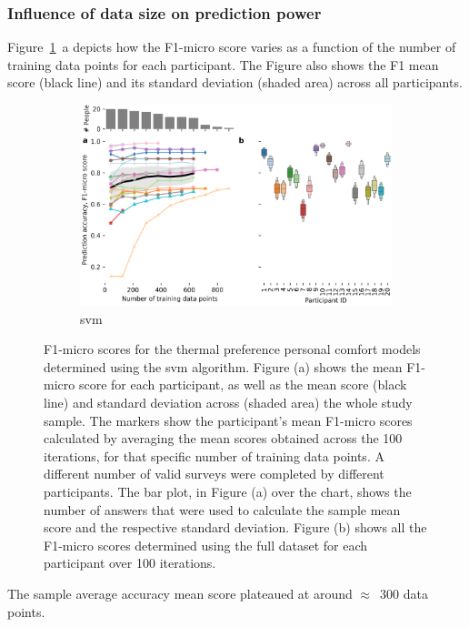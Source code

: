 \subsubsection{Influence of data size on prediction power}
Figure~\ref{fig:thermal_f1_micro_env_sma_oth}~a depicts how the F1-micro score varies as a function of the number of training data points for each participant.
The Figure also shows the F1 mean score (black line) and its standard deviation (shaded area) across all participants.
\begin{figure}
\centering
    \begin{subfigure}{\textwidth}
        \includegraphics[width=\linewidth,height=\textheight,keepaspectratio]{figures/figure_9}
        \caption{\acf{svm}}
    \end{subfigure}
    \caption{F1-micro scores for the thermal preference personal comfort models determined using the \acf{svm} algorithm.
    Figure (a) shows the mean F1-micro score for each participant, as well as the mean score (black line) and standard deviation across (shaded area) the whole study sample.
    The markers show the participant's mean F1-micro scores calculated by averaging the mean scores obtained across the 100 iterations, for that specific number of training data points.
    A different number of valid surveys were completed by different participants.
    The bar plot, in Figure (a) over the chart, shows the number of answers that were used to calculate the sample mean score and the respective standard deviation.
    Figure (b) shows all the F1-micro scores determined using the full dataset for each participant over 100 iterations.}\label{fig:thermal_f1_micro_env_sma_oth}
\end{figure}
The sample average accuracy mean score plateaued at around $\approx$~300 data points.
